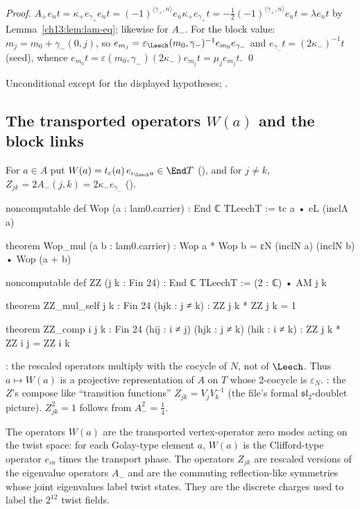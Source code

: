 \noindent\emph{Proof.} $A_+e_nt=\kappa_+e_{\gamma_+}e_nt=(-1)^{\langle\gamma_+,n\rangle}e_n\kappa_+e_{\gamma_+}t
=-\tfrac12(-1)^{\langle\gamma_+,n\rangle}e_nt=\lambda e_nt$ by Lemma~\ref{ch13:lem:lam-eq}; likewise for $A_-$. For
the block value: $m_j=m_0+\gamma_-(0,j)$, so $e_{m_j}=\varepsilon_\Leech(m_0,\gamma_-)^{-1}e_{m_0}e_{\gamma_-}$ and
$e_{\gamma_-}t=(2\kappa_-)^{-1}t$ (seed), whence $e_{m_0}t=\varepsilon(m_0,\gamma_-)(2\kappa_-)e_{m_j}t=\mu_je_{m_j}t$. \qed
\begin{status}Unconditional except for the displayed hypotheses;
.\end{status}

\subsection{\texorpdfstring{The transported operators $W(a)$ and the block links}{The transported operators W(a) and the block links}}
\begin{definition}\label{ch13:def:Wop}
For $a\in A$ put $W(a)=t_c(a)\,e_{\iota_\Leech a}\in\End T$ (), and for $j\ne k$,
$Z_{jk}=2A_-(j,k)=2\kappa_-e_{\gamma_-}$ ().
\end{definition}
\begin{leancode}
noncomputable def Wop (a : lam0.carrier) : End ℂ TLeechT := tc a • eL (inclΛ a)

theorem Wop_mul (a b : lam0.carrier) : Wop a * Wop b = εN (inclN a) (inclN b) • Wop (a + b)

noncomputable def ZZ (j k : Fin 24) : End ℂ TLeechT := (2 : ℂ) • AM j k

theorem ZZ_mul_self {j k : Fin 24} (hjk : j ≠ k) : ZZ j k * ZZ j k = 1

theorem ZZ_comp {i j k : Fin 24} (hij : i ≠ j) (hjk : j ≠ k) (hik : i ≠ k) :
    ZZ j k * ZZ i j = ZZ i k
\end{leancode}
\begin{dictionary}
: the rescaled operators multiply with the cocycle of $N$, not of $\Leech$. Thus $a\mapsto W(a)$
is a projective representation of $A$ on $T$ whose 2-cocycle is $\varepsilon_N$. : the
$Z$'s compose like ``transition functions'' $Z_{jk}=V_jV_k^{-1}$ (the file's formal $\mathfrak{sl}_2$-doublet
picture). $Z_{jk}^2=1$ follows from $A_-^2=\tfrac14$.
\end{dictionary}
\begin{physics}
The operators $W(a)$ are the transported vertex-operator zero modes acting on the twist space: for each Golay-type element $a$, $W(a)$ is the Clifford-type operator $e_{\iota a}$ times the transport phase. The operators $Z_{jk}$ are rescaled versions of the eigenvalue operators $A_-$ and are the commuting reflection-like symmetries whose joint eigenvalues label twist states. They are the discrete charges used to label the $2^{12}$ twist fields.
\end{physics}
